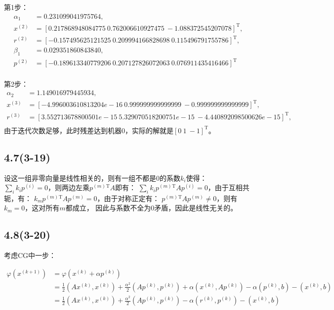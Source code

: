 \documentclass[UTF8,zihao=5]{ctexart}
\newcommand{\trans}[0]{^\mathrm{T}}
\begin{document}
第1步：
$$
    \begin{aligned}
        \alpha_1 & = 0.231099041975764,                                                \\
        x^{(2)}  & =[0.217868948084775\ 0.762006610927475\ -1.088372545207078]\trans,  \\
        r^{(2)}  & = [-0.157495625121525\ 0.209994166828698\ 0.115496791755786]\trans, \\
        \beta_1  & = 0.029351860843840,                                                \\
        p^{(2)}  & =[-0.189613340779206\ 0.207127826072063\ 0.076911435416466]\trans   \\
    \end{aligned}
$$

第2步：
$$
    \begin{aligned}
        \alpha_2 & = 1.149016979445934,                                                            \\
        x^{(3)}  & =[-4.996003610813204e-16\ 0.999999999999999\ -0.999999999999999]\trans,         \\
        r^{(3)}  & = [3.552713678800501e-15\ 5.329070518200751e-15\ -4.440892098500626e-15]\trans, \\
    \end{aligned}
$$
由于迭代次数足够，此时残差达到机器0，实际的解就是$[0\ 1\ -1]\trans$。

\subsection*{4.7(3-19)}
设这一组非零向量是线性相关的，则有一组不都是0的系数$k_i$使得：
$\sum_i{k_ip^{(i)}}=0$，则两边左乘$p^{(m)}{}\trans A$即有：
$\sum_i{k_ip^{(m)}{}\trans A p^{(i)}}=0$，由于互相共轭，有：
${k_mp^{(m)}{}\trans A p^{(m)}}=0$，由于对称正定有：
$p^{(m)}{}\trans A p^{(m)}\neq 0$，则有$k_m=0$，这对所有$m$都成立，
因此与系数不全为0矛盾，因此是线性无关的。

\subsection*{4.8(3-20)}

考虑CG中一步：

$$
    \begin{aligned}
        \varphi(x^{(k+1)}) & =\varphi(x^{(k)} + \alpha p^{(k)})  \\
                           & =
        \frac{1}{2}(Ax^{(k)},x^{(k)}) + \frac{\alpha^2}{2}(Ap^{(k)},p^{(k)})
        +\alpha(x^{(k)}, Ap^{(k)})-\alpha(p^{(k)},b)-(x^{(k)},b) \\
                           & =
        \frac{1}{2}(Ax^{(k)},x^{(k)}) + \frac{\alpha^2}{2}(Ap^{(k)},p^{(k)})
        -\alpha(r^{(k)}, p^{(k)})-(x^{(k)},b)                    \\
    \end{aligned}
$$
\end{document}
